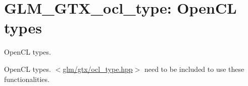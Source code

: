 \hypertarget{group__gtx__ocl__type}{\section{\-G\-L\-M\-\_\-\-G\-T\-X\-\_\-ocl\-\_\-type\-: \-Open\-C\-L types}
\label{group__gtx__ocl__type}
}


\-Open\-C\-L types.  


\-Open\-C\-L types. $<$\hyperlink{ocl__type_8hpp}{glm/gtx/ocl\-\_\-type.\-hpp}$>$ need to be included to use these functionalities. 